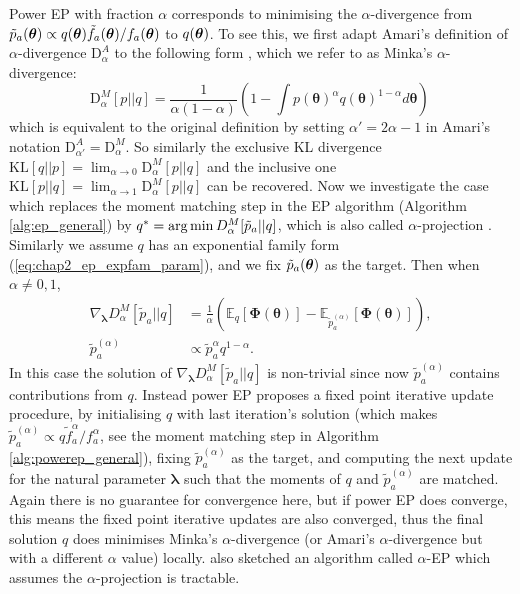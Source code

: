 Power EP with fraction $\alpha$ corresponds to minimising the $\alpha$-divergence from $\tilde{p}_{a}(\bm{\theta}) \propto q(\bm{\theta}) \tilde{f}_a(\bm{\theta}) / f_a(\bm{\theta})$ to $q(\bm{\theta})$. To see this, we first adapt Amari's definition \citep{amari:ig1985} of $\alpha$-divergence $\mathrm{D}_{\alpha}^{A}$ to the following form \citep{zhu:divergence1995, minka:divergence2005}, which we refer to as Minka's $\alpha$-divergence:
\begin{equation}
 \mathrm{D}_{\alpha}^{M}[p||q] = \frac{1}{\alpha (1 - \alpha)} \left( 1 - \int p(\bm{\theta})^{\alpha} q(\bm{\theta})^{1 - \alpha} d\bm{\theta}\right)\,
\end{equation}
which is equivalent to the original definition by setting $\alpha' = 2 \alpha - 1$ in Amari's notation $\mathrm{D}_{\alpha'}^A = \mathrm{D}_{\alpha}^M$.
%
So similarly the exclusive KL divergence $\mathrm{KL}[q || p] = \lim_{\alpha \rightarrow 0} \mathrm{D}_{\alpha}^M [p || q]$ and the inclusive one $\mathrm{KL}[p || q] = \lim_{\alpha \rightarrow 1} \mathrm{D}_{\alpha}^M [p || q]$ can be recovered. Now we investigate the case which replaces the moment matching step in the EP algorithm (Algorithm \ref{alg:ep_general}) by $q^* = \operatorname*{arg\,min} D_{\alpha}^M[\tilde{p}_{a}||q]$, which is also called $\alpha$-projection \citep{amari:ig2000}. Similarly we assume $q$ has an exponential family form (\ref{eq:chap2_ep_expfam_param}), and we fix $\tilde{p}_{a}(\bm{\theta})$ as the target. Then when $\alpha \neq 0, 1$,
\begin{equation*}
\begin{aligned}
\nabla_{\bm{\lambda}} D_{\alpha}^M[\tilde{p}_{a}||q] &= \frac{1}{\alpha} \left( \mathbb{E}_{q}[\bm{\Phi}(\bm{\theta})] - \mathbb{E}_{\tilde{p}_{a}^{(\alpha)}}[\bm{\Phi}(\bm{\theta})] \right), \\
\tilde{p}_{a}^{(\alpha)} &\propto \tilde{p}_a^{\alpha} q^{1 - \alpha}.
\end{aligned}
\end{equation*}
In this case the solution of $\nabla_{\bm{\lambda}} D_{\alpha}^M[\tilde{p}_{a}||q]$ is non-trivial since now $\tilde{p}_{a}^{(\alpha)}$ contains contributions from $q$. Instead power EP proposes a fixed point iterative update procedure, by initialising $q$ with last iteration's solution (which makes $\tilde{p}_{a}^{(\alpha)} \propto q \tilde{f}_a^{\alpha} / f_a^{\alpha}$, see the moment matching step in Algorithm \ref{alg:powerep_general}), fixing $\tilde{p}_{a}^{(\alpha)}$ as the target, and computing the next update for the natural parameter $\bm{\lambda}$ such that the moments of $q$ and $\tilde{p}_a^{(\alpha)}$ are matched. Again there is no guarantee for convergence here, but if power EP does converge, this means the fixed point iterative updates are also converged, thus the final solution $q$ does minimises Minka's $\alpha$-divergence (or Amari's $\alpha$-divergence but with a different $\alpha$ value) locally. \cite{minka:powerep2004} also sketched an algorithm called $\alpha$-EP which assumes the $\alpha$-projection is tractable.

